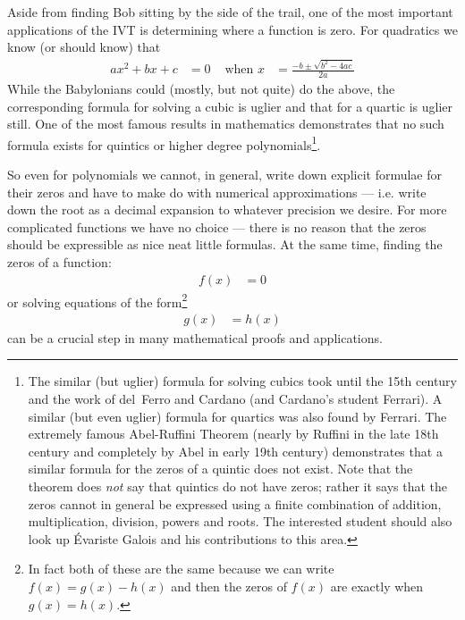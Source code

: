 Aside from finding Bob sitting by the side of the trail, one of the most
important applications of the IVT is determining where a function is zero. For
quadratics we know (or should know) that
\begin{align*}
  ax^2+bx+c &= 0 & \text{ when } x &= \frac{-b \pm \sqrt{b^2-4ac}}{2a}
\end{align*}
While the Babylonians could (mostly, but not quite) do the above, the corresponding
formula for solving a cubic is uglier and that for a quartic is uglier still. One of
the most famous results in mathematics demonstrates that no such
formula exists for quintics or higher degree polynomials\footnote{The similar
(but uglier) formula for solving cubics took until the 15th century and the
work of del~Ferro and Cardano (and Cardano's student Ferrari). A similar (but
even uglier) formula for quartics was also found by Ferrari. The extremely
famous  Abel-Ruffini Theorem (nearly by Ruffini in the late 18th century and
completely by Abel in early 19th century) demonstrates  that a similar formula
for the zeros of a quintic does not exist. Note that the theorem does
\emph{not} say that quintics do not have zeros; rather it says that the zeros
cannot in general be expressed using a finite combination of addition,
multiplication, division, powers and roots. The interested student should also
look up \'Evariste Galois and his contributions to this area.}.

So even for polynomials we cannot, in general, write down explicit
formulae for their zeros and have to make do with numerical approximations ---
i.e. write down the root as a decimal expansion to whatever precision we desire.
For more complicated functions we have no choice --- there is no reason that the
zeros should be expressible as nice neat little formulas. At the same time,
finding the zeros of a function:
\begin{align*}
  f(x) &= 0
\end{align*}
or solving equations of the form\footnote{In fact both of these are the same because we
can write $f(x)=g(x)-h(x)$ and then the zeros of $f(x)$ are exactly when $g(x)=h(x)$.}
\begin{align*}
  g(x) &= h(x)
\end{align*}
can be a crucial step in many mathematical proofs and applications.

